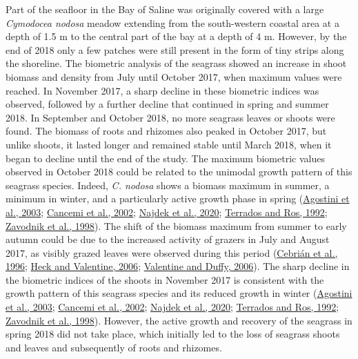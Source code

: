 \documentclass[
  12 pt,
]{book}
\begin{document}
Part of the seafloor in the Bay of Saline was originally covered with a large \emph{Cymodocea nodosa} meadow extending from the south-western coastal area at a depth of 1.5 \si{m} to the central part of the bay at a depth of 4 \si{m}. However, by the end of 2018 only a few patches were still present in the form of tiny strips along the shoreline. The biometric analysis of the seagrass showed an increase in shoot biomass and density from July until October 2017, when maximum values were reached. In November 2017, a sharp decline in these biometric indices was observed, followed by a further decline that continued in spring and summer 2018. In September and October 2018, no more seagrass leaves or shoots were found. The biomass of roots and rhizomes also peaked in October 2017, but unlike shoots, it lasted longer and remained stable until March 2018, when it began to decline until the end of the study. The maximum biometric values observed in October 2018 could be related to the unimodal growth pattern of this seagrass species. Indeed, \emph{C. nodosa} shows a biomass maximum in summer, a minimum in winter, and a particularly active growth phase in spring (\protect\hyperlink{ref-Agostini2003}{Agostini et al., 2003}; \protect\hyperlink{ref-Cancemi2002}{Cancemi et al., 2002}; \protect\hyperlink{ref-Najdek2020a}{Najdek et al., 2020}; \protect\hyperlink{ref-Terrados1992}{Terrados and Ros, 1992}; \protect\hyperlink{ref-Zavodnik1998}{Zavodnik et al., 1998}). The shift of the biomass maximum from summer to early autumn could be due to the increased activity of grazers in July and August 2017, as visibly grazed leaves were observed during this period (\protect\hyperlink{ref-Cebrian1996}{Cebrián et al., 1996}; \protect\hyperlink{ref-Heck2006}{Heck and Valentine, 2006}; \protect\hyperlink{ref-Valentine2006}{Valentine and Duffy, 2006}). The sharp decline in the biometric indices of the shoots in November 2017 is consistent with the growth pattern of this seagrass species and its reduced growth in winter (\protect\hyperlink{ref-Agostini2003}{Agostini et al., 2003}; \protect\hyperlink{ref-Cancemi2002}{Cancemi et al., 2002}; \protect\hyperlink{ref-Najdek2020a}{Najdek et al., 2020}; \protect\hyperlink{ref-Terrados1992}{Terrados and Ros, 1992}; \protect\hyperlink{ref-Zavodnik1998}{Zavodnik et al., 1998}). However, the active growth and recovery of the seagrass in spring 2018 did not take place, which initially led to the loss of seagrass shoots and leaves and subsequently of roots and rhizomes.
\end{document}
